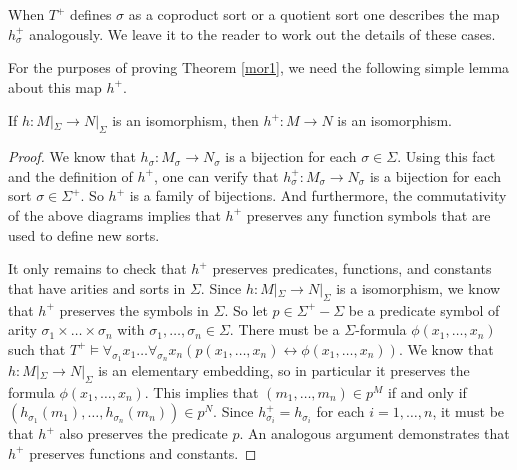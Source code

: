 When $T^+$ defines $\sigma$ as a coproduct sort or a quotient sort one
describes the map $h^+_\sigma$ analogously.  We leave it to the reader
to work out the details of these cases.

For the purposes of proving Theorem \ref{mor1}, we need the following
simple lemma about this map $h^+$.

\begin{lemma} If $h:M|_\Sigma\rightarrow N|_\Sigma$ is an isomorphism,
  then $h^+:M\rightarrow N$ is an isomorphism. \label{lemmon}
\end{lemma}

\begin{proof} We know that $h_\sigma:M_\sigma\rightarrow N_\sigma$ is
  a bijection for each $\sigma\in\Sigma$. Using this fact and the
  definition of $h^+$, one can verify that
  $h^+_\sigma:M_\sigma\rightarrow N_\sigma$ is a bijection for each
  sort $\sigma\in\Sigma^+$. So $h^+$ is a family of bijections. And
  furthermore, the commutativity of the above diagrams implies that
  $h^+$ preserves any function
  symbols %
  that are used to define new sorts.

  It only remains to check that $h^+$ preserves predicates, functions,
  and constants that have arities and sorts in $\Sigma$. Since
  $h:M|_\Sigma\rightarrow N|_\Sigma$ is a isomorphism, we know that
  $h^+$ preserves the symbols in $\Sigma$. So let
  $p\in\Sigma^+-\Sigma$ be a predicate symbol of arity
  $\sigma_1\times\ldots\times\sigma_n$ with
  $\sigma_1,\ldots,\sigma_n\in\Sigma$. There must be a
  $\Sigma$-formula $\phi(x_1,\ldots,x_n)$ such that
  $T^+\vDash\forall_{\sigma_1}x_1\ldots\forall_{\sigma_n}x_n(p(x_1,\ldots,x_n)\leftrightarrow\phi(x_1,\ldots,x_n))$. We
  know that $h:M|_\Sigma\rightarrow N|_\Sigma$ is an elementary
  embedding, so in particular it preserves the formula
  $\phi(x_1,\ldots, x_n)$. This implies that $(m_1,\ldots,m_n)\in p^M$
  if and only if
  $(h_{\sigma_1}(m_1),\ldots,h_{\sigma_n}(m_n))\in p^N$. Since
  $h^+_{\sigma_i}=h_{\sigma_i}$ for each $i=1,\ldots, n$, it must be
  that $h^+$ also preserves the predicate $p$. An analogous argument
  demonstrates that $h^+$ preserves functions and constants.
\end{proof}


